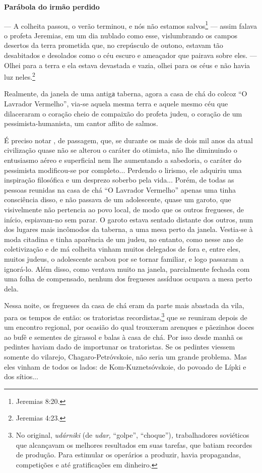 \textbf{Parábola do irmão perdido}

--- A colheita passou, o verão terminou, e nós não estamos
salvos\footnote{Jeremias 8:20.} --- assim falava o profeta Jeremias, em
um dia nublado como esse, vislumbrando os campos desertos da terra
prometida que, no crepúsculo de outono, estavam tão desabitados e
desolados como o céu escuro e ameaçador que pairava sobre eles. ---
Olhei para a terra e ela estava devastada e vazia, olhei para os céus e
não havia luz neles.\footnote{Jeremias 4:23.}

Realmente, da janela de uma antigа taberna, agora a casa de chá do
colcoz ``O Lavrador Vermelho'', via-se aquela mesma terra e aquele mesmo
céu que dilaceraram o coração cheio de compaixão do profeta judeu, o
coração de um pessimista-humanista, um cantor aflito de salmos.

É preciso notar , de passagem, que, se durante os mais de dois mil anos
da atual civilização quase não se alterou o caráter do otimista, não lhe
diminuindo o entusiasmo aéreo e superficial nem lhe aumentando a
sabedoria, o caráter do pessimista modificou-se por completo... Perdendo
o lirismo, ele adquiriu uma inspiração filosófica e um desprezo soberbo
pela vida... Porém, de todas as pessoas reunidas na casa de chá ``O
Lavrador Vermelho'' apenas uma tinha consciência disso, e não passava de
um adolescente, quase um garoto, que visivelmente não pertencia ao povo
local, de modo que os outros fregueses, de início, espiavam-no sem
parar. O garoto estava sentado distante dos outros, num dos lugares mais
incômodos da taberna, a uma mesa perto da janela. Vestia-se à moda
citadina e tinha aparência de um judeu, no entanto, como nesse ano de
coletivização e de má colheita vinham muitos delegados de fora e, entre
eles, muitos judeus, o adolescente acabou por se tornar familiar, e logo
passaram a ignorá-lo. Além disso, como ventava muito na janela,
parcialmente fechada com uma folha de compensado, nenhum dos fregueses
assíduos ocupava a mesa perto dela.

Nessa noite, os fregueses da casa de chá eram da parte mais abastada da
vila, para os tempos de então: os tratoristas recordistas,\footnote{No
  original, \emph{udárniki} (de \emph{udar,} ``golpe'',
  ``choque'')\emph{,} trabalhadores soviéticos que alcançavam os
  melhores resultados em suas tarefas, que batiam recordes de produção.
  Para estimular os operários a produzir, havia propagandas, competições
  e até gratificações em dinheiro.} que se reuniram depois de um
encontro regional, por ocasião do qual trouxeram arenques e pãezinhos
doces ao bufê e sementes de girassol e balas à casa de chá. Por isso
desde manhã os pedintes haviam dado de importunar os tratoristas. Se os
pedintes viessem somente do vilarejo, Chagaro-Petróvskoie, não seria um
grande problema. Mas eles vinham de todos os lados: de
Kom-Kuznetsóvskoie, do povoado de Lípki e dos sítios...

